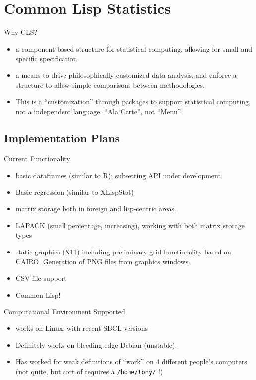 \documentclass{beamer}
\begin{document}
\section{Common Lisp Statistics}
\label{sec:CLS}

\begin{frame}{Why CLS?}
  \begin{itemize}
  \item a component-based structure for statistical computing,
    allowing for small and specific specification.
  \item a means to drive philosophically customized data analysis, and
    enforce a structure to allow simple comparisons between
    methodologies.
  \item This is a ``customization'' through packages to support
    statistical computing, not a independent language.  ``Ala Carte'',
    not ``Menu''.
  \end{itemize}
\end{frame}

\subsection{Implementation Plans}
\label{sec:CLS:impl}


\begin{frame}{Current Functionality}
  \begin{itemize}
  \item basic dataframes (similar to R); subsetting API under
    development.
  \item Basic regression (similar to XLispStat)
  \item matrix storage both in foreign and lisp-centric areas.
  \item LAPACK (small percentage, increasing), working with both
    matrix storage types
  \item static graphics (X11) including preliminary grid functionality based
    on CAIRO.  Generation of PNG files from graphics windows.
  \item CSV file support
  \item Common Lisp!
  \end{itemize}
\end{frame}

\begin{frame}[fragile]{Computational Environment Supported}
  \begin{itemize}
  \item works on Linux, with recent SBCL versions
  \item Definitely works on bleeding edge Debian (unstable).
  \item Has worked for weak definitions of ``work'' on 4 different
    people's computers (not quite, but sort of requires a
    \verb+/home/tony/+ !)
  \end{itemize}
\end{frame}
\end{document}
